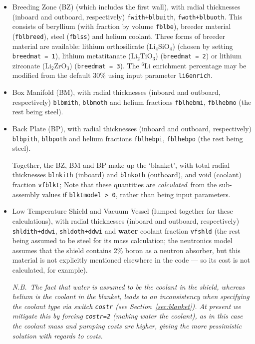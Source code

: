 \documentclass[11pt,a4paper]{report}
\begin{document}
\begin{itemize}

\item Breeding Zone (BZ) (which includes the first wall), with radial
  thicknesses (inboard and outboard, respectively) \texttt{fwith+blbuith},
  \texttt{fwoth+blbuoth}. This consists of beryllium (with fraction by volume
  \texttt{fblbe}), breeder material (\texttt{fblbreed}), steel
  (\texttt{fblss}) and helium coolant. Three forms of breeder material are
  available: lithium orthosilicate (Li$_4$SiO$_4$) (chosen by setting
  \texttt{breedmat = 1}), lithium metatitanate (Li$_2$TiO$_3$)
  (\texttt{breedmat = 2}) or lithium zirconate (Li$_2$ZrO$_3$)
  (\texttt{breedmat = 3}). The $^6$Li enrichment percentage may be modified
  from the default 30\% using input parameter \texttt{li6enrich}.

\item Box Manifold (BM), with radial thicknesses (inboard and outboard,
  respectively) \texttt{blbmith}, \texttt{blbmoth} and helium fractions
  \texttt{fblhebmi}, \texttt{fblhebmo} (the rest being steel).

\item Back Plate (BP), with radial thicknesses (inboard and outboard,
  respectively) \texttt{blbpith}, \texttt{blbpoth} and helium fractions
  \texttt{fblhebpi}, \texttt{fblhebpo} (the rest being steel).

Together, the BZ, BM and BP make up the `blanket', with total radial
thicknesses \texttt{blnkith} (inboard) and \texttt{blnkoth} (outboard), and
void (coolant) fraction \texttt{vfblkt}; Note that these
quantities are \textit{calculated}\ from the sub-assembly values if
\texttt{blktmodel > 0}, rather than being input parameters.

\item Low Temperature Shield and Vacuum Vessel (lumped together for these
  calculations), with radial thicknesses (inboard and outboard, respectively)
  \texttt{shldith+ddwi}, \texttt{shldoth+ddwi} and \textbf{water} coolant
  fraction \texttt{vfshld} (the rest being assumed to be steel for its mass
  calculation; the neutronics model assumes that the shield contains 2\% boron
  as a neutron absorber, but this material is not explicitly mentioned
  elsewhere in the code --- so its cost is not calculated, for example).

  \textit{N.B.\ The fact that water is assumed to be the coolant in the
    shield, whereas helium is the coolant in the blanket, leads to an
    inconsistency when specifying the coolant type via switch \texttt{costr}
    (see Section~\ref{sec:blanket}). At present we mitigate this by forcing
    \texttt{costr=2} (making water the coolant), as in this case the coolant
    mass and pumping costs are higher, giving the more pessimistic solution
    with regards to costs.}

\end{itemize}
\end{document}
